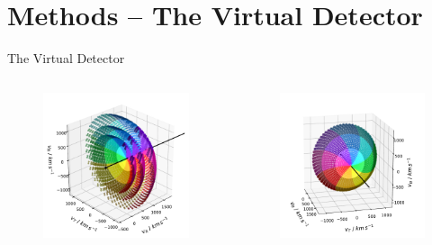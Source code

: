 \documentclass{beamer}
\begin{document}
\section{Methods -- The Virtual Detector}
\begin{frame}{The Virtual Detector}
\begin{columns}
	\column[]{6.5cm}
	\begin{figure}
	\includegraphics[scale=0.35]{Pics/col_shells.pdf}
\end{figure}
	
	
	\column[]{6.5cm}
	\begin{figure}
		\includegraphics[scale=0.38]{Pics/col_vspace_normal.pdf}
	\end{figure}


\end{columns}
\end{frame}
\end{document}
